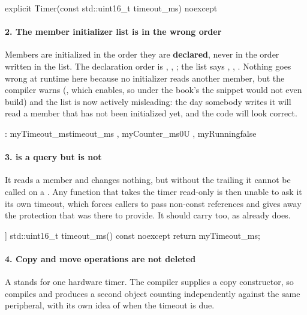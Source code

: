 \begin{cppcode}
explicit Timer(const std::uint16_t timeout_ms) noexcept
\end{cppcode}

\paragraph{2. The member initializer list is in the wrong order}
Members are initialized in the order they are \textbf{declared}, never in the order written in the
list. The declaration order is , , ; the list
says , , . Nothing goes wrong at runtime here
because no initializer reads another member, but the compiler warns (, which
 enables, so under the book's  the snippet would not even build) and the
list is now actively misleading: the day somebody writes  it will
read a member that has not been initialized yet, and the code will look correct.

\begin{cppcode}
: myTimeout_ms{timeout_ms}
, myCounter_ms{0U}
, myRunning{false}
\end{cppcode}

\paragraph{3.  is a query but is not }
It reads a member and changes nothing, but without the trailing  it cannot be called on
a . Any function that takes the timer read-only is then unable to ask it its own
timeout, which forces callers to pass non-const references and gives away the protection that
 was there to provide. It should carry \code{[[nodiscard]]} too, as 
already does.

\begin{cppcode}
[[nodiscard]] std::uint16_t timeout_ms() const noexcept { return myTimeout_ms; }
\end{cppcode}

\paragraph{4. Copy and move operations are not deleted}
A  stands for one hardware timer. The compiler supplies a copy constructor, so
 compiles and produces a second object counting independently
against the same peripheral, with its own idea of when the timeout is due.

